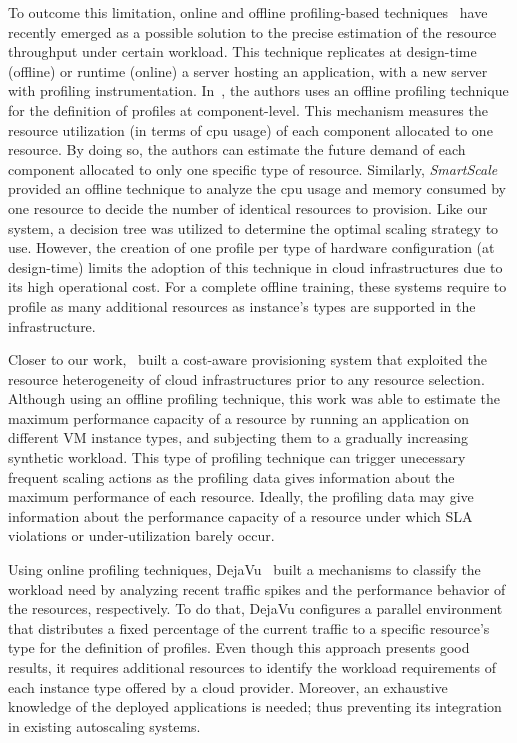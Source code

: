  
To outcome this limitation, online and offline profiling-based techniques~\cite{kaviani_profiling-as--service:_2011} have recently emerged as a possible solution to the precise estimation of the resource throughput under certain workload. This technique replicates at design-time (offline) or runtime (online) a server hosting an application, with a new server with profiling instrumentation. In~\cite{roy_2011}, the authors uses an offline profiling technique for the definition of profiles at component-level. This mechanism measures the resource utilization (in terms of cpu usage) of each component allocated to one resource. By doing so, the authors can estimate the future demand of each component allocated to only one specific type of resource. Similarly, \emph{SmartScale}~\cite{smartscale_2012} provided an offline technique to analyze the cpu usage and memory consumed by one resource to decide the number of identical resources to provision. Like our system, a decision tree was utilized to determine the optimal scaling strategy to use. However, the creation of one profile per type of hardware configuration (at design-time) limits the adoption of this technique in cloud infrastructures due to its high operational cost. For a complete offline training, these systems require to profile as many additional resources as instance's types are supported in the infrastructure. 

Closer to our work,~\cite{sharma_cost-aware_2011} built a cost-aware provisioning system that exploited the resource heterogeneity of cloud infrastructures prior to any resource selection. Although using an offline profiling technique, this work was able to estimate the maximum performance capacity of a resource by running an application on different VM instance types, and subjecting them to a gradually increasing synthetic workload. This type of profiling technique can trigger unecessary frequent scaling actions as the profiling data gives information about the maximum performance of each resource. Ideally, the profiling data may give information about the performance capacity of a resource under which SLA violations or under-utilization barely occur.

Using online profiling techniques, DejaVu~\cite{dejavu2012}  built a mechanisms to classify the workload need by analyzing recent traffic spikes and the performance behavior of the resources, respectively. To do that, DejaVu configures a parallel environment that distributes a fixed percentage of the current traffic to a specific resource's type for the definition of profiles. Even though this approach presents good results, it requires additional resources to identify the workload requirements of each instance type offered by a cloud provider. Moreover, an exhaustive knowledge of the deployed applications is needed; thus preventing its integration in existing autoscaling systems.  

